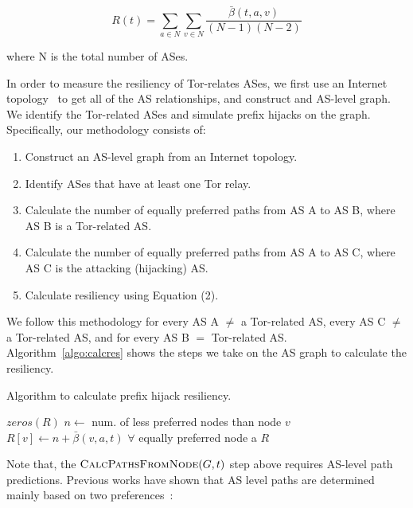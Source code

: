 \begin{equation}
R(t) = \sum_{a \in N} \sum_{v \in N} \frac {\bar{\beta}(t,a,v)} {(N-1)(N-2)}
\end{equation}

where N is the total number of ASes.

In order to measure the resiliency of Tor-relates ASes, we first use an Internet topology~\cite{caida} to get all of the AS relationships, and construct and AS-level graph.  We identify the Tor-related ASes and simulate prefix hijacks on the graph. Specifically, our methodology consists of:

\begin{enumerate}
\item Construct an AS-level graph from an Internet topology.
\item Identify ASes that have at least one Tor relay.
\item Calculate the number of equally preferred paths from AS A to AS B, where AS B is a Tor-related AS.
\item Calculate the number of equally preferred paths from AS A to AS C, where AS C is the attacking (hijacking) AS.
\item Calculate resiliency using Equation (2).
\end{enumerate}

We follow this methodology for every AS A $\neq$ a Tor-related AS, every AS C $\neq$ a Tor-related AS, and for every AS B $=$ Tor-related AS.  Algorithm~\ref{algo:calcres} shows the steps we take on the AS graph to calculate the resiliency.

\begin{algorithm}
\caption{Algorithm to calculate prefix hijack resiliency.}
\label{algo:calcres}
\begin{algorithmic}
    \State {}
    \State $zeros(R)$
		\State $n \gets $ num. of less preferred nodes than node $v$
		\State $R[v] \gets n + \bar{\beta}(v,a,t)$ $\forall$ equally preferred node a
	\EndIf
    \EndFor
    \State \Return $R$
\EndFunction
\end{algorithmic}
\end{algorithm}

Note that, the $\Call{CalcPathsFromNode}{G,t}$ step above requires AS-level path predictions. Previous works have shown that AS level paths are determined mainly based on two preferences~\cite{starov2015measuring}:

